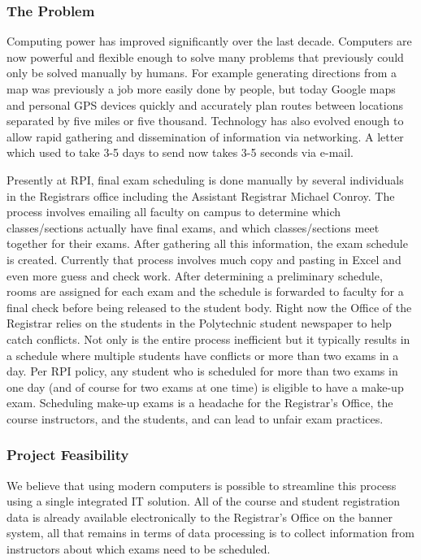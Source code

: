 \documentclass[11pt]{article}
\begin{document}
\subsubsection{The Problem}
Computing power has improved significantly over the last decade.  Computers are now powerful and flexible enough to solve many problems that previously could only be solved manually by humans.  For example generating directions from a map was previously a job more easily done by people, but today Google maps and personal GPS devices quickly and accurately plan routes between locations separated by five miles or five thousand.  Technology has also evolved enough to allow rapid gathering and dissemination of information via networking.  A letter which used to take 3-5 days to send now takes  3-5 seconds via e-mail.

\par Presently at RPI, final exam scheduling is done manually by several individuals in the Registrars office including the Assistant Registrar Michael Conroy.  The process involves emailing all faculty on campus to determine which classes/sections actually have final exams, and which classes/sections meet together for their exams.  After gathering all this information, the exam schedule is created.  Currently that process involves much copy and pasting in Excel and even more guess and check work.  After determining a preliminary schedule, rooms are assigned for each exam and the schedule is forwarded to faculty for a final check before being released to the student body.  Right now the Office of the Registrar relies on the students in the Polytechnic student newspaper to help catch conflicts.  Not only is the entire process inefficient but it typically results in a schedule where multiple students have conflicts or more than two exams in a day.  Per RPI policy, any student who is scheduled for more than two exams in one day (and of course for two exams at one time) is eligible to have a make-up exam. Scheduling make-up exams is a headache for the Registrar's Office, the course instructors, and the students, and can lead to unfair exam practices.

\subsubsection{Project Feasibility}
\par We believe that using modern computers is possible to streamline this process using a single integrated IT solution.  All of the course and student registration data is already available electronically to the Registrar's Office on the banner system, all that remains in terms of data processing is to collect information from instructors about which exams need to be scheduled.
\end{document}
